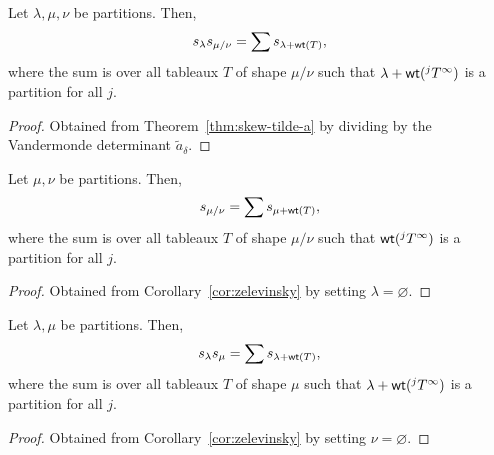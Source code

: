 \begin{corollary}[Zelevinsky] \label{cor:zelevinsky}
    Let \(\lambda, \mu, \nu\) be partitions.
    Then,
    \begin{equation}
        s_{\lambda} s_{\mu / \nu} =
        \sum s_{\lambda + \operatorname{\mathsf{wt}}(T)},
    \end{equation}
    where the sum is over all tableaux \(T\) of shape \(\mu/\nu\) such that \(\lambda + \operatorname{\mathsf{wt}}(^jT^\infty)\) is a partition for all \(j\).
\end{corollary}

\begin{proof}
    Obtained from Theorem~\ref{thm:skew-tilde-a} by dividing by the Vandermonde determinant \(\tilde{a}_\delta\).
\end{proof}

\begin{corollary}
    Let \(\mu, \nu\) be partitions.
    Then,
    \begin{equation}
        s_{\mu / \nu} = \sum s_{\mu + \operatorname{\mathsf{wt}}(T)},
    \end{equation}
    where the sum is over all tableaux \(T\) of shape \(\mu/\nu\) such that \(\operatorname{\mathsf{wt}}(^jT^\infty)\) is a partition for all \(j\).
\end{corollary}

\begin{proof}
    Obtained from Corollary~\ref{cor:zelevinsky} by setting \(\lambda = \varnothing\).
\end{proof}

\begin{corollary}
    Let \(\lambda, \mu\) be partitions.
    Then,
    \begin{equation}
        s_{\lambda} s_{\mu} = \sum s_{\lambda + \operatorname{\mathsf{wt}}(T)},
    \end{equation}
    where the sum is over all tableaux \(T\) of shape \(\mu\) such that \(\lambda + \operatorname{\mathsf{wt}}(^jT^\infty)\) is a partition for all \(j\).
\end{corollary}

\begin{proof}
    Obtained from Corollary~\ref{cor:zelevinsky} by setting \(\nu = \varnothing\).
\end{proof}

